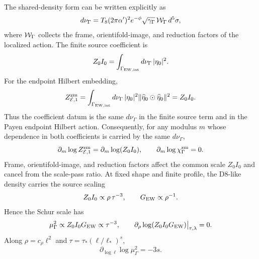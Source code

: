 \documentclass[11pt]{article}
\theoremstyle{definition}
\theoremstyle{remark}
\begin{document}
The shared-density form can be written explicitly as
\[
  d\nu_\Gamma
  =
  T_8(2\pi\alpha')^2e^{-\phi}\sqrt{\gamma_\Gamma}\,
  {\cal W}_\Gamma\,d^5\sigma ,
\]
where \({\cal W}_\Gamma\) collects the frame, orientifold-image, and
reduction factors of the localized action.  The finite source coefficient is
\[
  Z_0I_0
  =
  \int_{\Gamma_{\rm EW,int}}d\nu_\Gamma\,|\eta_0|^2 .
\]
For the endpoint Hilbert embedding,
\[
  Z_{\mathcal E,1}^{\rm zm}
  =
  \int_{\Gamma_{\rm EW,int}}d\nu_\Gamma\,|\eta_0|^2
  \|\widehat\eta_0\odot\widehat\eta_0\|^2
  =
  Z_0I_0 .
\]
Thus the coefficient datum is the same \(d\nu_\Gamma\) in the finite source
term and in the Payen endpoint Hilbert action.
Consequently, for any modulus \(m\) whose dependence in both coefficients is
carried by the same \(d\nu_\Gamma\),
\[
  \partial_m\log Z_{\mathcal E,1}^{\rm zm}
  =
  \partial_m\log(Z_0I_0),
  \qquad
  \partial_m\log\chi_\Gamma^{\rm zm}=0.
\]
Frame, orientifold-image, and reduction factors affect the common scale
\(Z_0I_0\) and cancel from the scale-pass ratio.
At fixed shape and finite profile, the D8-like density carries the source
scaling
\[
  Z_0I_0\propto \rho\,\tau^{-3},
  \qquad
  G_{\rm EW}\propto \rho^{-1}.
\]
Hence the Schur scale has
\[
  \mu_\Gamma^2\propto Z_0I_0G_{\rm EW}\propto \tau^{-3},
  \qquad
  \partial_\rho\log(Z_0I_0G_{\rm EW})\big|_{\tau,\lambda}=0.
\]
Along \(\rho=c_\rho\ell^2\) and
\(\tau=\tau_*(\ell/\ell_*)^s\),
\[
  \partial_{\log\ell}\log\mu_\Gamma^2=-3s.
\]
\end{document}
